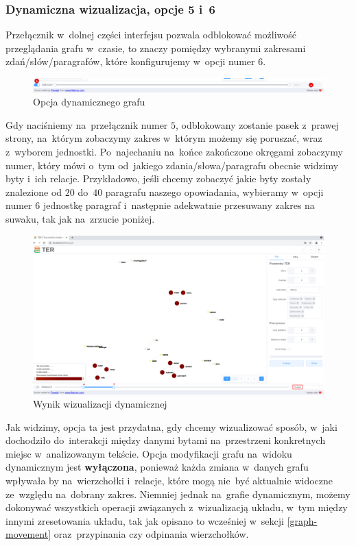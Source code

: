 \documentclass[12pt, a4paper]{article}
\begin{document}
\subsubsection{Dynamiczna wizualizacja, opcje 5 i~6}

Przełącznik w~dolnej części interfejsu pozwala odblokować możliwość przeglądania grafu w~czasie, to znaczy pomiędzy wybranymi zakresami zdań/słów/paragrafów, które konfigurujemy w~opcji numer $6$.

\begin{figure}[H]
  \centering
  \includegraphics[width=\linewidth]{images/graph-down-menu.png}
  \caption{Opcja dynamicznego grafu}
\end{figure}

Gdy naciśniemy na~przełącznik numer $5$, odblokowany zostanie pasek z~prawej strony, na~którym zobaczymy zakres w~którym możemy się poruszać, wraz z~wyborem jednostki. Po~najechaniu na~końce zakończone okręgami zobaczymy numer, który mówi o~tym od~jakiego zdania/słowa/paragrafu obecnie widzimy byty i~ich relacje. Przykładowo, jeśli chcemy zobaczyć jakie byty zostały znalezione od $20$ do~$40$ paragrafu naszego opowiadania, wybieramy w~opcji numer $6$ jednostkę paragraf i~następnie adekwatnie przesuwany zakres na suwaku, tak jak na~zrzucie poniżej.

\begin{figure}[H]
  \centering
  \includegraphics[width=\linewidth]{images/graph-dynamic.png}
  \caption{Wynik wizualizacji dynamicznej}
\end{figure}

Jak widzimy, opcja ta jest przydatna, gdy chcemy wizualizować sposób, w~jaki dochodziło do~interakcji między danymi bytami na~przestrzeni konkretnych miejsc w~analizowanym tekście. Opcja modyfikacji grafu na~widoku dynamicznym jest \textbf{wyłączona}, ponieważ każda zmiana w~danych grafu wpływała by na~wierzchołki i~relacje, które mogą nie~być aktualnie widoczne ze~względu na~dobrany zakres. Niemniej jednak na~grafie dynamicznym, możemy dokonywać wszystkich operacji związanych z~wizualizacją układu, w~tym między innymi zresetowania układu, tak jak opisano to wcześniej w~sekcji \ref{graph-movement} oraz~przypinania czy odpinania wierzchołków.
\end{document}
